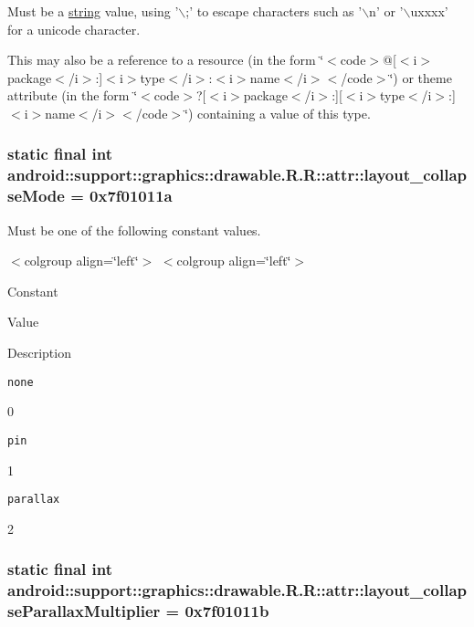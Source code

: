 Must be a \hyperlink{classandroid_1_1support_1_1graphics_1_1drawable_1_1_r_1_1string}{string} value, using '$\backslash$;' to escape characters such as '$\backslash$n' or '$\backslash$uxxxx' for a unicode character. 

This may also be a reference to a resource (in the form \char`\"{}$<$code$>$@\mbox{[}$<$i$>$package$<$/i$>$:\mbox{]}$<$i$>$type$<$/i$>$:$<$i$>$name$<$/i$>$$<$/code$>$\char`\"{}) or theme attribute (in the form \char`\"{}$<$code$>$?\mbox{[}$<$i$>$package$<$/i$>$:\mbox{]}\mbox{[}$<$i$>$type$<$/i$>$:\mbox{]}$<$i$>$name$<$/i$>$$<$/code$>$\char`\"{}) containing a value of this type. \hypertarget{classandroid_1_1support_1_1graphics_1_1drawable_1_1_r_1_1attr_440ca68361d164aa080a25fe150dac47}{
\subsubsection[{layout\_\-collapseMode}]{\setlength{\rightskip}{0pt plus 5cm}static final int android::support::graphics::drawable.R.R::attr::layout\_\-collapseMode = 0x7f01011a}}
\label{classandroid_1_1support_1_1graphics_1_1drawable_1_1_r_1_1attr_440ca68361d164aa080a25fe150dac47}


Must be one of the following constant values. \begin{TabularC}{0}
\hline
\end{TabularC}
$<$colgroup align=\char`\"{}left\char`\"{}$>$ $<$colgroup align=\char`\"{}left\char`\"{}$>$ 

Constant

Value

Description 

{\tt none}

0

{\tt pin}

1

{\tt parallax}

2\hypertarget{classandroid_1_1support_1_1graphics_1_1drawable_1_1_r_1_1attr_e5cb01a1b1bad1d711e296923d730c25}{
\subsubsection[{layout\_\-collapseParallaxMultiplier}]{\setlength{\rightskip}{0pt plus 5cm}static final int android::support::graphics::drawable.R.R::attr::layout\_\-collapseParallaxMultiplier = 0x7f01011b}}
\label{classandroid_1_1support_1_1graphics_1_1drawable_1_1_r_1_1attr_e5cb01a1b1bad1d711e296923d730c25}


